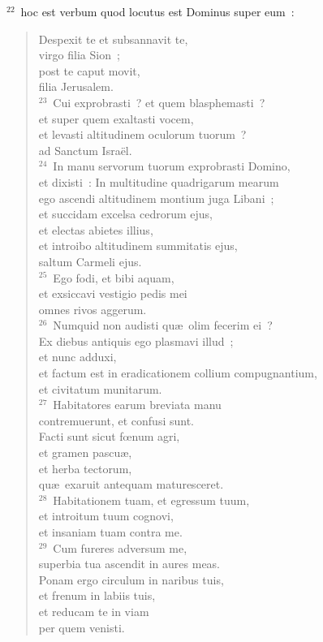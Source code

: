 ${}^{22}$~hoc est verbum quod locutus est Dominus super eum~: \begin{flushleft}\begin{verse}Despexit te et subsannavit te,\\ virgo filia Sion~;\\ post te caput movit,\\ filia Jerusalem.\\
${}^{23}$~Cui exprobrasti~? et quem blasphemasti~?\\ et super quem exaltasti vocem,\\ et levasti altitudinem oculorum tuorum~?\\ ad Sanctum Isra\"el.\\
${}^{24}$~In manu servorum tuorum exprobrasti Domino,\\ et dixisti~: In multitudine quadrigarum mearum\\ ego ascendi altitudinem montium juga Libani~;\\ et succidam excelsa cedrorum ejus,\\ et electas abietes illius,\\ et introibo altitudinem summitatis ejus,\\ saltum Carmeli ejus.\\
${}^{25}$~Ego fodi, et bibi aquam,\\ et exsiccavi vestigio pedis mei\\ omnes rivos aggerum.\\
${}^{26}$~Numquid non audisti qu\ae\ olim fecerim ei~?\\ Ex diebus antiquis ego plasmavi illud~;\\ et nunc adduxi,\\ et factum est in eradicationem collium compugnantium,\\ et civitatum munitarum.\\
${}^{27}$~Habitatores earum breviata manu\\ contremuerunt, et confusi sunt.\\ Facti sunt sicut fœnum agri,\\ et gramen pascu\ae ,\\ et herba tectorum,\\ qu\ae\ exaruit antequam maturesceret.\\
${}^{28}$~Habitationem tuam, et egressum tuum,\\ et introitum tuum cognovi,\\ et insaniam tuam contra me.\\
${}^{29}$~Cum fureres adversum me,\\ superbia tua ascendit in aures meas.\\ Ponam ergo circulum in naribus tuis,\\ et frenum in labiis tuis,\\ et reducam te in viam\\ per quem venisti.\end{verse}\end{flushleft}


